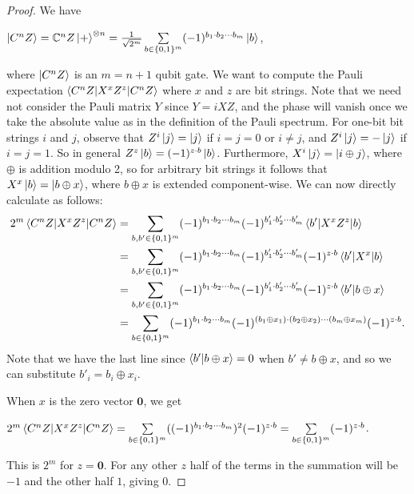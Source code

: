 \documentclass[12pt]{dalthesis}
\begin{document}
\begin{proof}
We have 
\begin{center}
$\ket{C^n Z} = \mathbb{C}^n Z \ket{+}^{\otimes n} = \frac{1}{\sqrt{2^m}} \sum\limits_{b \in \{0, 1\}^m} (-1)^{b_1 \cdot b_2 \cdots b_m} \ket{b}$,
\end{center}
where $\ket{C^nZ}$ is an $m = n+1$ qubit gate. We want to compute the Pauli expectation $\braket{C^n Z|X^xZ^z|C^n Z}$ where $x$ and $z$ are bit strings. Note that we need not consider the Pauli matrix $Y$ since $Y = iXZ$, and the phase will vanish once we take the absolute value as in the definition of the Pauli spectrum. For one-bit bit strings $i$ and $j$, observe that $Z^i \ket{j} = \ket{j}$ if $i=j=0$ or $i \neq j$, and $Z^i \ket{j} = -\ket{j}$ if $i=j=1$. So in general $Z^z \ket{b} = (-1)^{z \cdot b}\ket{b}$. Furthermore, $X^i \ket{j} = \ket{i \oplus j}$, where $\oplus$ is addition modulo 2, so for arbitrary bit strings it follows that $X^x\ket{b} = \ket{b \oplus x}$, where $b \oplus x$ is extended component-wise. We can now directly calculate as follows:
\begin{equation*}
\begin{split}
2^m\braket{C^n Z|X^xZ^z|C^n Z} & = \sum\limits_{b, b' \in \{0, 1\}^m} (-1)^{b_1 \cdot b_2 \cdots b_m} (-1)^{b'_1 \cdot b'_2 \cdots b'_m} \braket{b'|X^xZ^z|b} \\
& = \sum\limits_{b, b' \in \{0, 1\}^m} (-1)^{b_1 \cdot b_2 \cdots b_m} (-1)^{b'_1 \cdot b'_2 \cdots b'_m} (-1)^{z \cdot b} \braket{b'|X^x|b} \\
& = \sum\limits_{b, b' \in \{0, 1\}^m} (-1)^{b_1 \cdot b_2 \cdots b_m} (-1)^{b'_1 \cdot b'_2 \cdots b'_m} (-1)^{z \cdot b} \braket{b'|b \oplus x} \\
& = \sum\limits_{b \in \{0, 1\}^m} (-1)^{b_1 \cdot b_2 \cdots b_m} (-1)^{(b_1 \oplus x_1) \cdot (b_2 \oplus x_2) \cdots (b_m \oplus x_m)} (-1)^{z \cdot b}.
\end{split}
\end{equation*}
Note that we have the last line since $\braket{b'|b \oplus x} = 0$ when $b' \neq b \oplus x$, and so we can substitute $b'_i = b_i \oplus x_i$. 

When $x$ is the zero vector $\textbf{0}$, we get 
\begin{center}
$2^m\braket{C^n Z|X^xZ^z|C^n Z} = \sum\limits_{b \in \{0, 1\}^m} ((-1)^{b_1 \cdot b_2 \cdots b_m})^2  (-1)^{z \cdot b} = \sum\limits_{b \in \{0, 1\}^m} (-1)^{z \cdot b}$.
\end{center} 
This is $2^m$ for $z = \textbf{0}$. For any other $z$ half of the terms in the summation will be $-1$ and the other half $1$, giving $0$. 


\end{proof}
\end{document}
